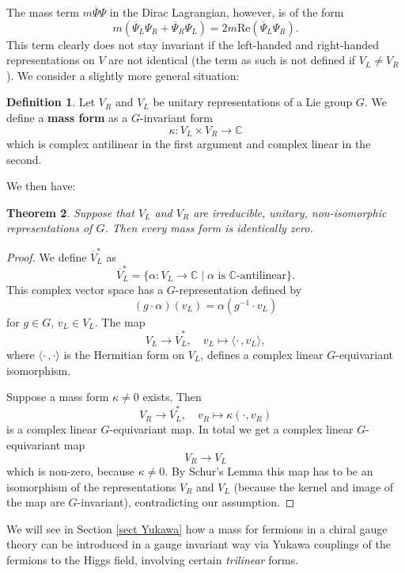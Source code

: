 \documentclass[12pt]{amsart}
\newtheorem{thm}{Theorem}[section]
\theoremstyle{definition}
\newtheorem{defn}[thm]{Definition}
\theoremstyle{remark}
\numberwithin{equation}{section}
\begin{document}
The mass term $m\overline{\Psi}\Psi$ in the Dirac Lagrangian, however, is of the form
\begin{equation*}
m\left(\overline{\Psi}_L\Psi_R+\overline{\Psi}_R\Psi_L\right)=2m\mathrm{Re}\left(\overline{\Psi}_L\Psi_R\right).
\end{equation*}
This term clearly does not stay invariant if the left-handed and right-handed representations on $V$ are not identical (the term as such is not defined if $V_L\neq V_R$). We consider a slightly more general situation:
\begin{defn}Let $V_R$ and $V_L$ be unitary representations of a Lie group $G$. We define a {\bf mass form} as a $G$-invariant form
\begin{equation*}
\kappa\colon V_L\times V_R\longrightarrow \mathbb{C}
\end{equation*}
which is complex antilinear in the first argument and complex linear in the second.
\end{defn}
We then have:
\begin{thm}
Suppose that $V_L$ and $V_R$ are irreducible, unitary, non-isomorphic representations of $G$. Then every mass form is identically zero.
\end{thm}
\begin{proof} We define $\overline{V}_L^*$ as
\begin{equation*}
\overline{V}_L^*=\{\alpha\colon V_L\rightarrow\mathbb{C}\mid \alpha\text{ is $\mathbb{C}$-antilinear}\}.
\end{equation*}
This complex vector space has a $G$-representation defined by
\begin{equation*}
(g\cdot\alpha)(v_L)=\alpha\left(g^{-1}\cdot v_L\right)
\end{equation*}
for $g\in G$, $v_L\in V_L$. The map
\begin{equation*}
V_L\longrightarrow \overline{V}_L^*,\quad v_L\longmapsto \langle\cdot\,,v_L\rangle,
\end{equation*}
where $\langle\cdot\,,\cdot\rangle$ is the Hermitian form on $V_L$, defines a complex linear $G$-equivariant isomorphism.

Suppose a mass form $\kappa\neq 0$ exists. Then
\begin{equation*}
V_R\longrightarrow \overline{V}_L^*,\quad v_R\longmapsto \kappa(\cdot,v_R)
\end{equation*}
is a complex linear $G$-equivariant map. In total we get a complex linear $G$-equivariant map
\begin{equation*}
V_R\longrightarrow V_L
\end{equation*}
which is non-zero, because $\kappa\neq 0$. By Schur's Lemma this map has to be an isomorphism of the representations $V_R$ and $V_L$ (because the kernel and image of the map are $G$-invariant), contradicting our assumption.
\end{proof}
We will see in Section \ref{sect Yukawa} how a mass for fermions in a chiral gauge theory can be introduced in a gauge invariant way via Yukawa couplings of the fermions to the Higgs field, involving certain {\em trilinear} forms.
\end{document}
